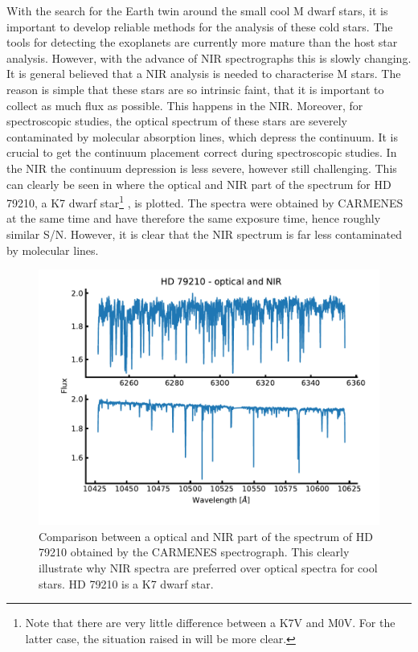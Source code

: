 With the search for the Earth twin around the small cool M dwarf stars, it is important to develop
reliable methods for the analysis of these cold stars. The tools for detecting the exoplanets are
currently more mature than the host star analysis. However, with the advance of NIR spectrographs
this is slowly changing. It is general believed that a NIR analysis is needed to characterise M
stars. The reason is simple that these stars are so intrinsic faint, that it is important to collect
as much flux as possible. This happens in the NIR. Moreover, for spectroscopic studies, the optical
spectrum of these stars are severely contaminated by molecular absorption lines, which depress the
continuum. It is crucial to get the continuum placement correct during spectroscopic studies. In the
NIR the continuum depression is less severe, however still challenging. This can clearly be seen in
 where the optical and NIR part of the spectrum for HD 79210, a K7 dwarf
star\footnote{Note that there are very little difference between a K7V and M0V. For the latter case,
the situation raised in  will be more clear.} \citep{Kirkpatrick1991}, is
plotted. The spectra were obtained by CARMENES at the same time and have therefore the same exposure
time, hence roughly similar S/N. However, it is clear that the NIR spectrum is far less contaminated
by molecular lines.

\begin{figure}[htpb!]
    \centering
    \includegraphics[width=1.0\linewidth]{figures/opticalVSnir.pdf}
    \caption{Comparison between a optical and NIR part of the spectrum of HD 79210 obtained by
             the CARMENES spectrograph. This clearly illustrate why NIR spectra are preferred over
             optical spectra for cool stars. HD 79210 is a K7 dwarf star.}
    \label{fig:opticalVSnir}
\end{figure}

